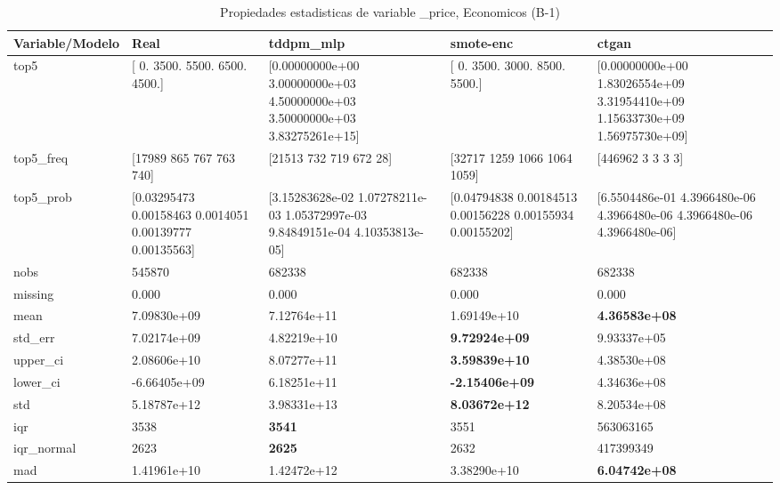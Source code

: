 \begin{table}[H]
\centering
\fontsize{8}{14}\selectfont
\caption{Propiedades  estadisticas de variable \_price, Economicos (B-1)}
\label{table-stats-economicos-b-1-_price}
\begin{tabular}{|l|m{10em}|m{10em}|m{10em}|m{10em}|}
\hline
 \rowcolor[gray]{0.8}
Variable/Modelo & Real & tddpm\_mlp & smote-enc & ctgan \\
\hline top5 & [   0. 3500. 5500. 6500. 4500.] & [0.00000000e+00 3.00000000e+03 4.50000000e+03 3.50000000e+03
 3.83275261e+15] & [   0. 3500. 3000. 8500. 5500.] & [0.00000000e+00 1.83026554e+09 3.31954410e+09 1.15633730e+09
 1.56975730e+09] \\
\hline top5\_freq & [17989   865   767   763   740] & [21513   732   719   672    28] & [32717  1259  1066  1064  1059] & [446962      3      3      3      3] \\
\hline top5\_prob & [0.03295473 0.00158463 0.0014051  0.00139777 0.00135563] & [3.15283628e-02 1.07278211e-03 1.05372997e-03 9.84849151e-04
 4.10353813e-05] & [0.04794838 0.00184513 0.00156228 0.00155934 0.00155202] & [6.5504486e-01 4.3966480e-06 4.3966480e-06 4.3966480e-06 4.3966480e-06] \\
\hline nobs & 545870 & 682338 & 682338 & 682338 \\
\hline missing & 0.000 & 0.000 & 0.000 & 0.000 \\
\hline mean & 7.09830e+09 & \cellcolor[rgb]{0.9, 0.54, 0.52} 7.12764e+11 & 1.69149e+10 & \bfseries 4.36583e+08 \\
\hline std\_err & 7.02174e+09 & \cellcolor[rgb]{0.9, 0.54, 0.52} 4.82219e+10 & \bfseries 9.72924e+09 & 9.93337e+05 \\
\hline upper\_ci & 2.08606e+10 & \cellcolor[rgb]{0.9, 0.54, 0.52} 8.07277e+11 & \bfseries 3.59839e+10 & 4.38530e+08 \\
\hline lower\_ci & -6.66405e+09 & \cellcolor[rgb]{0.9, 0.54, 0.52} 6.18251e+11 & \bfseries -2.15406e+09 & 4.34636e+08 \\
\hline std & 5.18787e+12 & \cellcolor[rgb]{0.9, 0.54, 0.52} 3.98331e+13 & \bfseries 8.03672e+12 & 8.20534e+08 \\
\hline iqr & 3538 & \bfseries 3541 & 3551 & \cellcolor[rgb]{0.9, 0.54, 0.52} 563063165 \\
\hline iqr\_normal & 2623 & \bfseries 2625 & 2632 & \cellcolor[rgb]{0.9, 0.54, 0.52} 417399349 \\
\hline mad & 1.41961e+10 & \cellcolor[rgb]{0.9, 0.54, 0.52} 1.42472e+12 & 3.38290e+10 & \bfseries 6.04742e+08 \\

\end{tabular}
\end{table}

